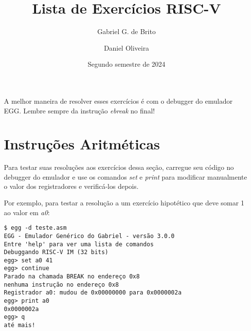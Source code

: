 \documentclass{article}
\title{Lista de Exercícios RISC-V}
\author{Gabriel G. de Brito \and Daniel Oliveira}
\date{Segundo semestre de 2024}
\begin{document}
\maketitle

A melhor maneira de resolver esses exercícios é com o debugger do emulador EGG.
Lembre sempre da instrução \textit{ebreak} no final!

\tableofcontents

\section{Instruções Aritméticas}

Para testar suas resoluções aos exercícios dessa seção, carregue seu código no
debugger do emulador e use os comandos \textit{set} e \textit{print} para
modificar manualmente o valor dos registradores e verificá-los depois.

Por exemplo, para testar a resolução a um exercício hipotético que deve somar 1
ao valor em \textit{a0}:

\begin{verbatim}
$ egg -d teste.asm
EGG - Emulador Genérico do Gabriel - versão 3.0.0
Entre 'help' para ver uma lista de comandos
Debuggando RISC-V IM (32 bits)
egg> set a0 41
egg> continue
Parado na chamada BREAK no endereço 0x8
nenhuma instrução no endereço 0x8
Registrador a0: mudou de 0x00000000 para 0x0000002a
egg> print a0
0x0000002a
egg> q
até mais!
\end{verbatim}
\end{document}
